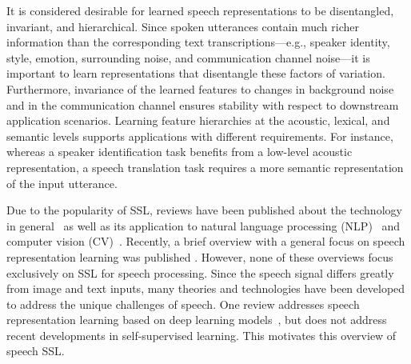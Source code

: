 


It is considered desirable for learned speech representations to be
disentangled, invariant, and hierarchical.
Since spoken utterances contain much richer information than the corresponding text
transcriptions---e.g., speaker identity, style, emotion, surrounding noise, and
communication channel noise---it is important to learn representations that
disentangle these factors of variation. Furthermore, invariance of the learned
features to changes in background noise and in the communication channel ensures
stability with respect to downstream application scenarios. Learning feature
hierarchies at the acoustic, lexical, and semantic levels supports applications
with different requirements. For instance, whereas a speaker identification task
benefits from a low-level acoustic representation, a speech
translation task requires a more semantic representation of the input
utterance. 

Due to the popularity of SSL, reviews have been published about the
technology in general~\cite{bommasani2021opportunities,ericsson2021selfsupervised,LiuSSLsurvey} as well as its application to natural language processing (NLP)~\cite{rogers-etal-2020-primer,liu2021pretrain,xia-etal-2020-bert,QiuSSLNLPsurvey} and computer vision (CV)~\cite{JingSSLCVsurvey}. Recently, a brief overview with a general focus on speech representation learning was published \cite{borgholt_22}. However, none of these overviews focus exclusively on SSL for speech processing. Since the speech signal differs greatly from image and text inputs, many  theories  and technologies have been developed to address the unique challenges of speech. One review addresses speech representation learning based on deep learning models~\cite{latif2021deep}, but does not address recent developments in self-supervised learning. This motivates this overview of speech SSL.


